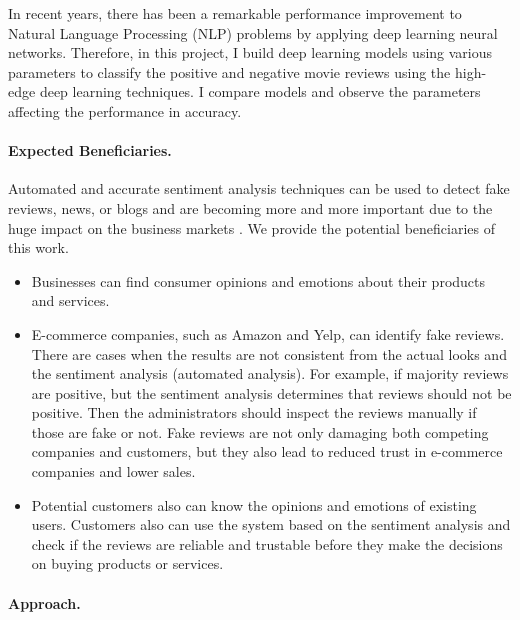 \documentclass[11pt]{article}
\begin{document}
In recent years, there has been a remarkable performance improvement
to Natural Language Processing (NLP) problems
by applying deep learning neural networks.
%
Therefore, in this project, I build deep learning models using various parameters to classify the positive and negative movie reviews using the high-edge deep learning techniques. I compare models and observe the parameters affecting the performance in accuracy.

\paragraph*{Expected Beneficiaries.}

Automated and accurate sentiment analysis techniques can be used to detect fake reviews, news, or blogs and are becoming more and more important due to the huge impact on the business markets \cite{DeepLearning_amazon} \cite{fakespot}. We provide the potential beneficiaries of this work.

\begin{itemize}
\item 	
Businesses can find consumer opinions and emotions about their products and services.
\item
E-commerce companies, such as Amazon and Yelp, can identify fake reviews. 
%
There are cases when the results are not consistent from the actual looks and the sentiment analysis (automated analysis). 
For example, if majority reviews are positive, but the sentiment analysis determines that reviews should not be positive.
%
Then the administrators should inspect the reviews manually if those are fake or not.
%
Fake reviews are not only damaging both competing companies and customers, but they also lead to reduced trust in e-commerce companies and lower sales.
\item
Potential customers also can know the opinions and emotions of existing users.
%
Customers also can use the system based on the sentiment analysis \cite{fakespot} and check if the reviews are reliable and trustable before they make the decisions on buying products or services.
\end{itemize}

\paragraph*{Approach.}
\end{document}
